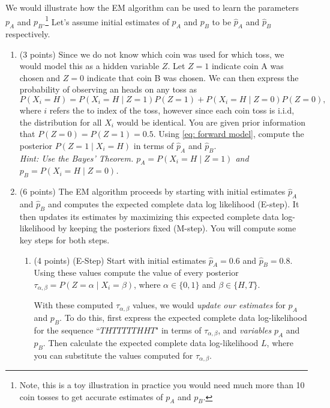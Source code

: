 \documentclass[11pt]{article}
\begin{document}
We would illustrate how the EM algorithm can be used to learn the parameters $p_A$ and $p_B$.\footnote{Note, this is a toy illustration in practice you would need much more than 10 coin tosses to get accurate estimates of $p_A$ and $p_B$.} Let's assume initial estimates of $p_A$ and $p_B$ to be $\hat{p}_A$ and $\hat{p}_B$ respectively.

\begin{enumerate}[(1)]
\item (3 points) Since we do not know which coin was used for which toss, we would model this as a hidden variable $Z$. Let $Z = 1$ indicate coin A was chosen and $Z = 0$ indicate that coin B was chosen. We can then express the probability of observing an heads on any toss as 
\begin{equation}
    P(X_i = H) = P(X_i = H \mid Z = 1)P(Z = 1) + P(X_i = H \mid Z = 0)P(Z = 0),
    \label{eq: forward model}
\end{equation}
where $i$ refers the to index of the toss, however since each coin toss is i.i.d, the distribution for all $X_i$ would be identical. You are given prior information that $P(Z = 0) = P(Z = 1) = 0.5$. Using \eqref{eq: forward model}, compute the posterior $P(Z = 1 \mid X_i = H)$ in terms of $\hat{p}_A$ and $\hat{p}_B$.\\
\textit{Hint: Use the Bayes' Theorem. $p_A = P(X_i = H \mid Z = 1)$ and $p_B = P(X_i = H \mid Z = 0)$. }

\begin{answertext}{10cm}{}

\end{answertext}

\item (6 points) The EM algorithm proceeds by starting with initial estimates $\hat{p}_A$ and $\hat{p}_B$ and computes the expected complete data log likelihood (E-step). It then updates its estimates by maximizing this expected complete data log-likelihood by keeping the posteriors fixed (M-step). You will compute some key steps for both steps.

\begin{enumerate}[(2.1)]
\item (4 points) (E-Step) Start with initial estimates $\hat{p}_A = 0.6$ and $\hat{p}_B = 0.8$. Using these values compute the value of every posterior $\tau_{\alpha, \beta} = P(Z = \alpha \mid X_i = \beta)$, where $\alpha \in \{0, 1\}$ and $\beta \in \{H, T\}$. 

With these computed $\tau_{\alpha, \beta}$ values, we would \textit{update our estimates} for $p_A$ and $p_B$. To do this, first express the expected complete data log-likelihood for the sequence ``$THTTTTTHHT$" in terms of $\tau_{\alpha, \beta}$, and \textit{variables} $p_A$ and $p_B$.  Then calculate the expected complete data log-likelihood $L$, where you can substitute the values computed for $\tau_{\alpha, \beta}$.


\end{enumerate}
\end{enumerate}
\end{document}
